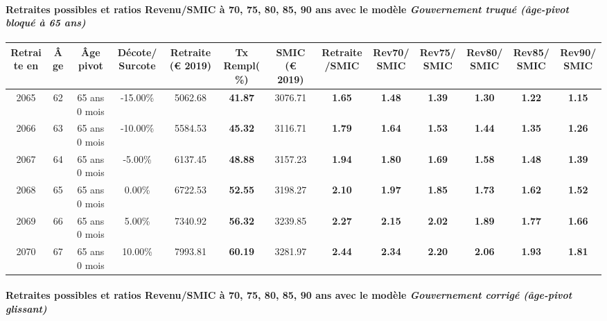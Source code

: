 \paragraph{Retraites possibles et ratios Revenu/SMIC à 70, 75, 80, 85, 90 ans avec le modèle \emph{Gouvernement truqué (âge-pivot bloqué à 65 ans)}}  
 
{ \scriptsize \begin{center} 
\begin{tabular}[htb]{|c|c||c|c||c|c||c||c|c|c|c|c|c|} 
\hline 
 Retraite en &  Âge &  Âge pivot &  Décote/Surcote &  Retraite (\euro{} 2019) &  Tx Rempl(\%) &  SMIC (\euro{} 2019) &  Retraite/SMIC &  Rev70/SMIC &  Rev75/SMIC &  Rev80/SMIC &  Rev85/SMIC &  Rev90/SMIC \\ 
\hline \hline 
 2065 &  62 &  65 ans 0 mois &  -15.00\% &  5062.68 &  {\bf 41.87} &  3076.71 &  {\bf 1.65} &  {\bf 1.48} &  {\bf 1.39} &  {\bf 1.30} &  {\bf 1.22} &  {\bf 1.15} \\ 
\hline 
 2066 &  63 &  65 ans 0 mois &  -10.00\% &  5584.53 &  {\bf 45.32} &  3116.71 &  {\bf 1.79} &  {\bf 1.64} &  {\bf 1.53} &  {\bf 1.44} &  {\bf 1.35} &  {\bf 1.26} \\ 
\hline 
 2067 &  64 &  65 ans 0 mois &  -5.00\% &  6137.45 &  {\bf 48.88} &  3157.23 &  {\bf 1.94} &  {\bf 1.80} &  {\bf 1.69} &  {\bf 1.58} &  {\bf 1.48} &  {\bf 1.39} \\ 
\hline 
 2068 &  65 &  65 ans 0 mois &  0.00\% &  6722.53 &  {\bf 52.55} &  3198.27 &  {\bf 2.10} &  {\bf 1.97} &  {\bf 1.85} &  {\bf 1.73} &  {\bf 1.62} &  {\bf 1.52} \\ 
\hline 
 2069 &  66 &  65 ans 0 mois &  5.00\% &  7340.92 &  {\bf 56.32} &  3239.85 &  {\bf 2.27} &  {\bf 2.15} &  {\bf 2.02} &  {\bf 1.89} &  {\bf 1.77} &  {\bf 1.66} \\ 
\hline 
 2070 &  67 &  65 ans 0 mois &  10.00\% &  7993.81 &  {\bf 60.19} &  3281.97 &  {\bf 2.44} &  {\bf 2.34} &  {\bf 2.20} &  {\bf 2.06} &  {\bf 1.93} &  {\bf 1.81} \\ 
\hline 
\hline 
\end{tabular} 
\end{center} } 
\paragraph{Retraites possibles et ratios Revenu/SMIC à 70, 75, 80, 85, 90 ans avec le modèle \emph{Gouvernement corrigé (âge-pivot glissant)}}  
 
